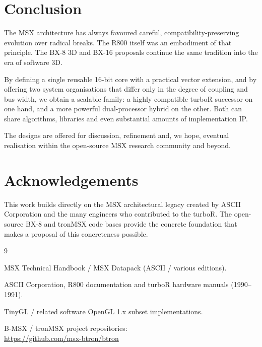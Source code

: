 \documentclass[11pt,a4paper]{article}
\begin{document}
\section{Conclusion}

The MSX architecture has always favoured careful, compatibility-preserving evolution over radical breaks. The R800 itself was an embodiment of that principle. The BX-8 3D and BX-16 proposals continue the same tradition into the era of software 3D.

By defining a single reusable 16-bit core with a practical vector extension, and by offering two system organisations that differ only in the degree of coupling and bus width, we obtain a scalable family: a highly compatible turboR successor on one hand, and a more powerful dual-processor hybrid on the other. Both can share algorithms, libraries and even substantial amounts of implementation IP.

The designs are offered for discussion, refinement and, we hope, eventual realisation within the open-source MSX research community and beyond.

\section*{Acknowledgements}

This work builds directly on the MSX architectural legacy created by ASCII Corporation and the many engineers who contributed to the turboR. The open-source BX-8 and tronMSX code bases provide the concrete foundation that makes a proposal of this concreteness possible.

\begin{thebibliography}{9}

MSX Technical Handbook / MSX Datapack (ASCII / various editions).

ASCII Corporation, R800 documentation and turboR hardware manuals (1990--1991).

TinyGL / related software OpenGL 1.x subset implementations.

B-MSX / tronMSX project repositories:\\
\url{https://github.com/msx-btron/btron}

\end{thebibliography}
\end{document}
